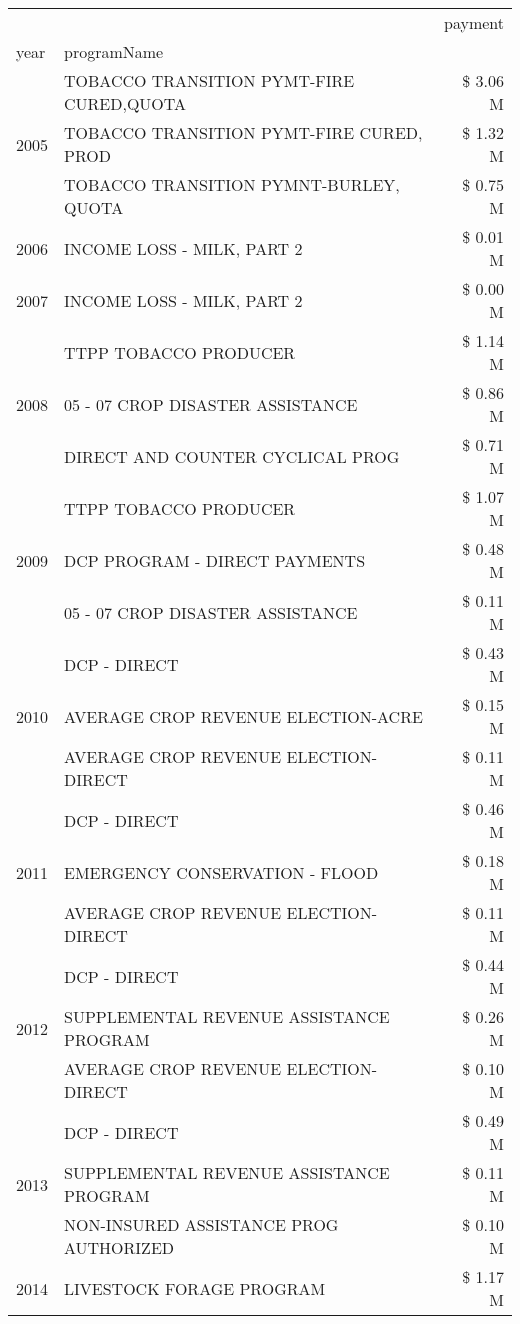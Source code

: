 \begin{tabular}{llr}
\toprule
 &  & payment \\
year & programName &  \\
\midrule
\multirow[t]{3}{*}{2005} & TOBACCO TRANSITION PYMT-FIRE CURED,QUOTA & \$ 3.06 M \\
 & TOBACCO TRANSITION PYMT-FIRE CURED, PROD & \$ 1.32 M \\
 & TOBACCO TRANSITION PYMNT-BURLEY, QUOTA & \$ 0.75 M \\
\cline{1-3}
2006 & INCOME LOSS - MILK, PART 2 & \$ 0.01 M \\
\cline{1-3}
2007 & INCOME LOSS - MILK, PART 2 & \$ 0.00 M \\
\cline{1-3}
\multirow[t]{3}{*}{2008} & TTPP TOBACCO PRODUCER & \$ 1.14 M \\
 & 05 - 07 CROP DISASTER ASSISTANCE & \$ 0.86 M \\
 & DIRECT AND COUNTER CYCLICAL PROG & \$ 0.71 M \\
\cline{1-3}
\multirow[t]{3}{*}{2009} & TTPP TOBACCO PRODUCER & \$ 1.07 M \\
 & DCP PROGRAM - DIRECT PAYMENTS & \$ 0.48 M \\
 & 05 - 07 CROP DISASTER ASSISTANCE & \$ 0.11 M \\
\cline{1-3}
\multirow[t]{3}{*}{2010} & DCP - DIRECT & \$ 0.43 M \\
 & AVERAGE CROP REVENUE ELECTION-ACRE & \$ 0.15 M \\
 & AVERAGE CROP REVENUE ELECTION-DIRECT & \$ 0.11 M \\
\cline{1-3}
\multirow[t]{3}{*}{2011} & DCP - DIRECT & \$ 0.46 M \\
 & EMERGENCY CONSERVATION - FLOOD & \$ 0.18 M \\
 & AVERAGE CROP REVENUE ELECTION-DIRECT & \$ 0.11 M \\
\cline{1-3}
\multirow[t]{3}{*}{2012} & DCP - DIRECT & \$ 0.44 M \\
 & SUPPLEMENTAL REVENUE ASSISTANCE PROGRAM & \$ 0.26 M \\
 & AVERAGE CROP REVENUE ELECTION-DIRECT & \$ 0.10 M \\
\cline{1-3}
\multirow[t]{3}{*}{2013} & DCP - DIRECT & \$ 0.49 M \\
 & SUPPLEMENTAL REVENUE ASSISTANCE PROGRAM & \$ 0.11 M \\
 & NON-INSURED ASSISTANCE PROG AUTHORIZED & \$ 0.10 M \\
\cline{1-3}
\multirow[t]{3}{*}{2014} & LIVESTOCK FORAGE PROGRAM & \$ 1.17 M \\

\end{tabular}

